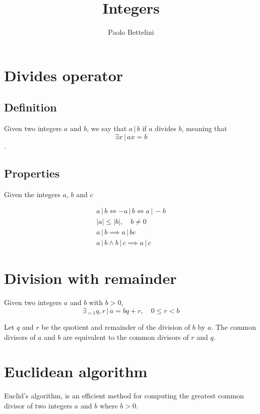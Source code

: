 \documentclass[a4paper]{article}
\title{Integers}
\author{Paolo Bettelini}
\date{}
\newcommand{\divides}{\,|\,}
\begin{document}
\maketitle
\tableofcontents
\pagebreak

\section{Divides operator}

\subsection{Definition}

Given two integers \(a\) and \(b\),
we say that \(a \divides b\) if \(a\) divides \(b\),
meaning that
\[
    \exists x \,|\, ax = b
\].

\subsection{Properties}

Given the integers \(a\), \(b\) and \(c\)

\begin{align*}
    a \divides b \iff -a \divides b \iff a \divides -b \\
    |a| \leq |b|, \quad b \neq 0 \\
    a \divides b \implies a \divides bc \\
    a \divides b \land b \divides c \implies a \divides c
\end{align*}

\section{Division with remainder}

Given two integers \(a\) and \(b\) with \(b > 0\),
\[
    \exists_{=1} q,r \,|\, a=bq+r, \quad 0 \leq r < b
\]


Let \(q\) and \(r\) be the quotient and remainder of the division of \(b\)
by \(a\).
The common divisors of \(a\) and \(b\) are equivalent to the common divisors of \(r\) and \(q\).


\section{Euclidean algorithm}

Euclid's algorithm, is an efficient method for computing the greatest common divisor of two integers
\(a\) and \(b\) where \(b > 0\).
\end{document}
